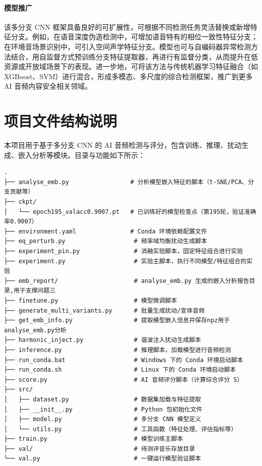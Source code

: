 \documentclass[a4paper,12pt]{article}
\begin{document}
\paragraph{模型推广} 
该多分支 CNN 框架具备良好的可扩展性，可根据不同检测任务灵活替换或新增特征分支。例如，在语音深度伪造检测中，可增加语音特有的相位一致性特征分支；在环境音场景识别中，可引入空间声学特征分支。模型也可与自编码器异常检测方法结合，用自监督方式预训练分支特征提取器，再进行有监督分类，从而提升在低资源或开放域场景下的表现。进一步地，可将该方法与传统机器学习特征融合（如 XGBoost、SVM）进行混合，形成多模态、多尺度的综合检测框架，推广到更多 AI 音频内容安全相关领域。

\appendix
\section{项目文件结构说明}

本项目用于基于多分支 CNN 的 AI 音频检测与评分，包含训练、推理、扰动生成、嵌入分析等模块。目录与功能如下所示：

\begin{verbatim}
.
├── analyse_emb.py                 # 分析模型嵌入特征的脚本（t-SNE/PCA、分支贡献等）
├── ckpt/
│   └── epoch195_valacc0.9007.pt   # 已训练好的模型检查点（第195轮，验证准确率0.9007）
├── environment.yaml               # Conda 环境依赖配置文件
├── eq_perturb.py                   # 频率域均衡扰动生成脚本
├── experiment_pin.py               # 消融实验脚本，固定特征组合进行实验
├── experiment.py                   # 实验主脚本，执行不同模型/特征组合的实验
├── emb_report/                     # analyse_emb.py 生成的嵌入分析报告目录,用于支撑问题三
├── finetune.py                     # 模型微调脚本
├── generate_multi_variants.py      # 批量生成扰动/变体音频
├── get_emb_info.py                 # 提取模型嵌入信息并保存npz用于analyse_emb.py分析
├── harmonic_inject.py              # 谐波注入扰动生成脚本
├── inference.py                    # 推理脚本，加载模型进行音频检测
├── run_conda.bat                   # Windows 下的 Conda 环境启动脚本
├── run_conda.sh                    # Linux 下的 Conda 环境启动脚本
├── score.py                        # AI 音频评分脚本（计算综合评分 S）
├── src/
│   ├── dataset.py                  # 数据集加载与特征提取
│   ├── __init__.py                 # Python 包初始化文件
│   ├── model.py                    # 多分支 CNN 模型定义
│   └── utils.py                    # 工具函数（特征处理、评估指标等）
├── train.py                        # 模型训练主脚本
├── val/                            # 待测评音乐存放目录
└── val.py                          # 一键运行模型验证脚本
\end{verbatim}
\end{document}
